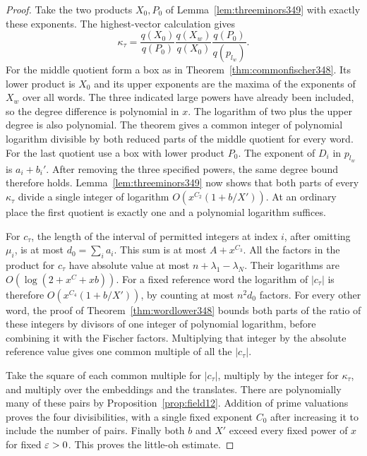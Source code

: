 \documentclass[a4paper,11pt]{article}
\theoremstyle{definition}
\theoremstyle{remark}
\numberwithin{equation}{section}
\begin{document}
\begin{proof}
Take the two products \(X_0,P_0\) of
Lemma~\ref{lem:threeminors349} with exactly these exponents.
The highest-vector calculation gives
\[
        \kappa_\tau=\frac{q(X_0)}{q(P_0)}
             \frac{q(X_w)}{q(X_0)}
             \frac{q(P_0)}{q(p_{l_w})}.
\]
For the middle quotient form a box as in
Theorem~\ref{thm:commonfischer348}. Its lower product is \(X_0\)
and its upper exponents are the maxima of the exponents of \(X_w\)
over all words. The three indicated large powers have already
been included, so the degree difference is polynomial in \(x\).
The logarithm of two plus the upper degree is also polynomial.
The theorem gives a common integer of polynomial logarithm
divisible by both reduced parts of the middle quotient for every
word. For the last quotient use a box with lower product \(P_0\).
The exponent of \(D_i\) in \(p_{l_w}\) is \(a_i+b_i'\).
After removing the three specified powers, the same degree bound
therefore holds. Lemma~\ref{lem:threeminors349} now shows that
both parts of every \(\kappa_\tau\) divide a single integer
of logarithm \(O(x^{C_2}(1+b/X'))\). At an ordinary place the
first quotient is exactly one and a polynomial logarithm suffices.

For \(c_\tau\), the length of the interval of permitted integers
at index \(i\), after omitting \(\mu_i\), is at most
\(d_0=\sum_i a_i\). This sum is at most \(A+x^{C_3}\).
All the factors in the product for \(c_\tau\) have absolute
value at most \(n+\lambda_1-\lambda_N\).
Their logarithms are \(O(\log(2+x^C+xb))\).
For a fixed reference word the logarithm of \(|c_\tau|\) is
therefore \(O(x^{C_4}(1+b/X'))\), by counting at most
\(n^2 d_0\) factors. For every other word, the proof of
Theorem~\ref{thm:wordlower348} bounds both parts of the ratio
of these integers by divisors of one integer of polynomial
logarithm, before combining it with the Fischer factors.
Multiplying that integer by the absolute reference value gives
one common multiple of all the \(|c_\tau|\).

Take the square of each common multiple for \(|c_\tau|\), multiply
by the integer for \(\kappa_\tau\), and multiply over the
embeddings and the translates. There are polynomially many of
these pairs by Proposition~\ref{prop:field12}. Addition of prime
valuations proves the four divisibilities, with a single fixed
exponent \(C_0\) after increasing it to include the number of
pairs. Finally both \(b\) and \(X'\) exceed every fixed power
of \(x\) for fixed \(\varepsilon>0\). This proves the little-oh estimate.
\end{proof}
\end{document}
